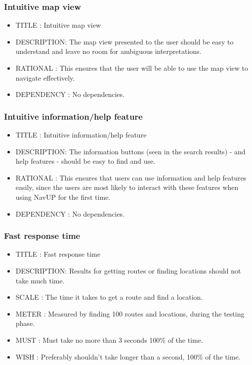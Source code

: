 \documentclass{article}
\begin{document}
			\subsubsection{Intuitive map view}
			\begin{itemize}
		    \item[]TITLE      : Intuitive map view
		    \item[]DESCRIPTION: The map view presented to the user should be easy to understand and leave no room for ambiguous interpretations.
		    \item[]RATIONAL   : This ensures that the user will be able to use the map view to navigate effectively.
		    \item[]DEPENDENCY : No dependencies.
		    \end{itemize}	
			\subsubsection{Intuitive information/help feature}
			\begin{itemize}
		    \item[]TITLE      : Intuitive information/help feature
		    \item[]DESCRIPTION: The information buttons (seen in the search results) - and help features - should be easy to find and use.
		    \item[]RATIONAL   : This ensures that users can use information and help features easily, since the users are most likely to interact with these features when using NavUP for the first time.
		    \item[]DEPENDENCY : No dependencies.
		    \end{itemize}	
			\subsubsection{Fast response time}
			\begin{itemize}
		    \item[]TITLE      : Fast response time
		    \item[]DESCRIPTION: Results for getting routes or finding locations should not take much time.
		    \item[]SCALE      : The time it takes to get a route and find a location.
		    \item[]METER      : Measured by finding 100 routes and locations, during the testing phase.
		    \item[]MUST       : Must take no more than 3 seconds 100\% of the time.
		    \item[]WISH       : Preferably shouldn't take longer than a second, 100\% of the time.  
		    \end{itemize}
\end{document}
